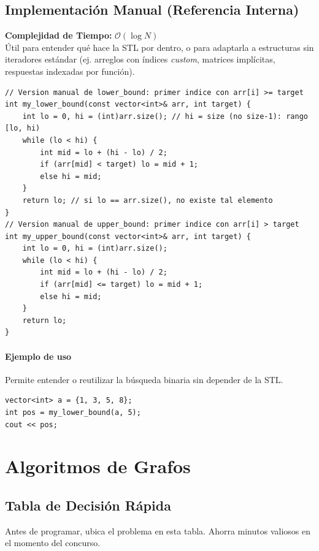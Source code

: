 \documentclass[10pt,twocolumn,letterpaper]{report}
\begin{document}
\section{Implementación Manual (Referencia Interna)}
\textbf{Complejidad de Tiempo:} $\mathcal{O}(\log N)$ \\
Útil para entender qué hace la STL por dentro, o para adaptarla a estructuras sin iteradores estándar (ej. arreglos con índices \textit{custom}, matrices implícitas, respuestas indexadas por función).
\begin{lstlisting}
// Version manual de lower_bound: primer indice con arr[i] >= target
int my_lower_bound(const vector<int>& arr, int target) {
    int lo = 0, hi = (int)arr.size(); // hi = size (no size-1): rango [lo, hi)
    while (lo < hi) {
        int mid = lo + (hi - lo) / 2;
        if (arr[mid] < target) lo = mid + 1;
        else hi = mid;
    }
    return lo; // si lo == arr.size(), no existe tal elemento
}
// Version manual de upper_bound: primer indice con arr[i] > target
int my_upper_bound(const vector<int>& arr, int target) {
    int lo = 0, hi = (int)arr.size();
    while (lo < hi) {
        int mid = lo + (hi - lo) / 2;
        if (arr[mid] <= target) lo = mid + 1;
        else hi = mid;
    }
    return lo;
}
\end{lstlisting}
\subsubsection*{Ejemplo de uso}
Permite entender o reutilizar la búsqueda binaria sin depender de la STL.
\begin{lstlisting}
vector<int> a = {1, 3, 5, 8};
int pos = my_lower_bound(a, 5);
cout << pos;
\end{lstlisting}

\chapter{Algoritmos de Grafos}

\section{Tabla de Decisión Rápida}
Antes de programar, ubica el problema en esta tabla. Ahorra minutos valiosos en el momento del concurso.
\end{document}
